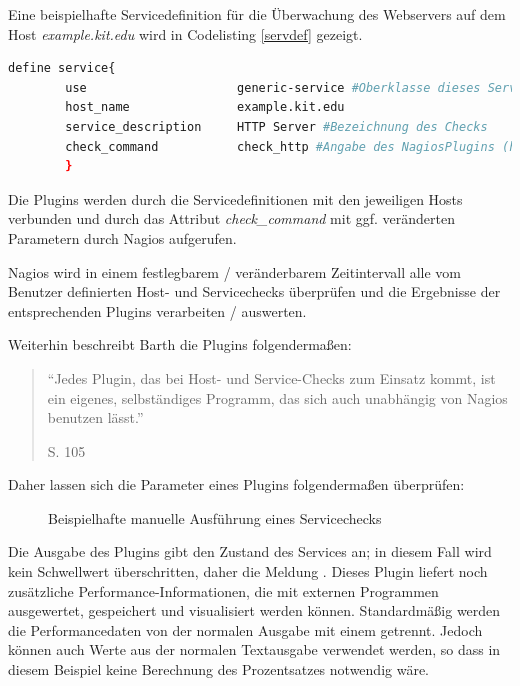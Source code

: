 Eine beispielhafte Servicedefinition für die Überwachung des Webservers auf dem Host \textit{example.kit.edu} wird in Codelisting \ref{servdef} gezeigt.

\begin{lstlisting}[captionpos=b, caption=Verkürzte Definition eines Hostobjektes, label=servdef, breaklines = true, language=sh]
define service{
        use                     generic-service #Oberklasse dieses Service-Objektes
        host_name               example.kit.edu
        service_description     HTTP Server #Bezeichnung des Checks
        check_command           check_http #Angabe des NagiosPlugins (hier ohne Parameter)
        }

\end{lstlisting}

Die Plugins werden durch die Servicedefinitionen mit den jeweiligen Hosts verbunden und durch das Attribut \textit{check\_command} mit ggf. veränderten Parametern durch Nagios aufgerufen.

Nagios wird in einem festlegbarem / veränderbarem Zeitintervall alle vom Benutzer definierten Host- und Servicechecks überprüfen und die Ergebnisse der entsprechenden Plugins verarbeiten / auswerten.

Weiterhin beschreibt Barth die Plugins folgendermaßen:
\begin{quote}"`Jedes Plugin, das bei Host- und Service-Checks zum Einsatz kommt, ist ein eigenes, selbständiges Programm, das sich auch unabhängig von Nagios benutzen lässt."' \begin{flushright}\cite{Barth08} S. 105\end{flushright}\end{quote} 

Daher lassen sich die Parameter eines Plugins folgendermaßen überprüfen:

\begin{figure}[ht]
	\centering
		\caption{Beispielhafte manuelle Ausführung eines Servicechecks}
		\label{check-swap}
\end{figure}

Die Ausgabe des Plugins gibt den Zustand des Services an; in diesem Fall wird kein Schwellwert überschritten, daher die Meldung .
Dieses Plugin liefert noch zusätzliche Performance-Informationen, die mit externen Programmen ausgewertet, gespeichert und visualisiert werden können.
Standardmäßig werden die Performancedaten von der normalen Ausgabe mit einem \pictext{|} getrennt.
Jedoch können auch Werte aus der normalen Textausgabe verwendet werden, so dass in diesem Beispiel keine Berechnung des Prozentsatzes notwendig wäre.

